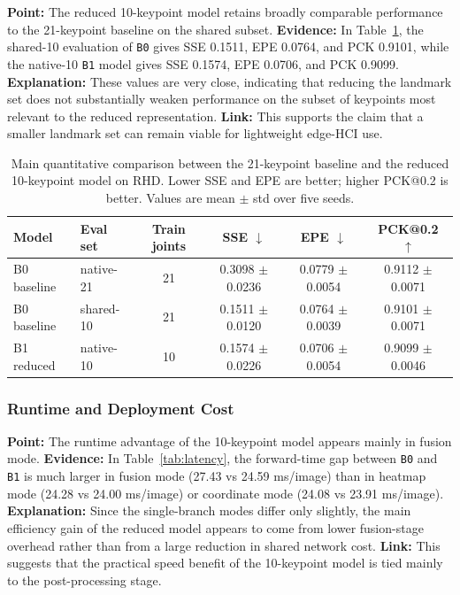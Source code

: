 \documentclass[10pt,letterpaper]{article}
\begin{document}
\noindent\textbf{Point:} The reduced 10-keypoint model retains broadly comparable performance to the 21-keypoint baseline on the shared subset.  
\textbf{Evidence:} In Table~\ref{tab:main_accuracy}, the shared-10 evaluation of \texttt{B0} gives SSE 0.1511, EPE 0.0764, and PCK 0.9101, while the native-10 \texttt{B1} model gives SSE 0.1574, EPE 0.0706, and PCK 0.9099.  
\textbf{Explanation:} These values are very close, indicating that reducing the landmark set does not substantially weaken performance on the subset of keypoints most relevant to the reduced representation.  
\textbf{Link:} This supports the claim that a smaller landmark set can remain viable for lightweight edge-HCI use.

\begin{table}[H]
\centering
\footnotesize
\caption{Main quantitative comparison between the 21-keypoint baseline and the reduced 10-keypoint model on RHD. Lower SSE and EPE are better; higher PCK@0.2 is better. Values are mean $\pm$ std over five seeds.}
\label{tab:main_accuracy}
\begin{tabular}{llcccc}
\toprule
Model & Eval set & Train joints & SSE $\downarrow$ & EPE $\downarrow$ & PCK@0.2 $\uparrow$ \\
\midrule
B0 baseline & native-21 & 21 & 0.3098 $\pm$ 0.0236 & 0.0779 $\pm$ 0.0054 & 0.9112 $\pm$ 0.0071 \\
B0 baseline & shared-10 & 21 & 0.1511 $\pm$ 0.0120 & 0.0764 $\pm$ 0.0039 & 0.9101 $\pm$ 0.0071 \\
B1 reduced & native-10 & 10 & 0.1574 $\pm$ 0.0226 & 0.0706 $\pm$ 0.0054 & 0.9099 $\pm$ 0.0046 \\
\bottomrule
\end{tabular}
\end{table}

\subsubsection{Runtime and Deployment Cost}

\medskip
\noindent\textbf{Point:} The runtime advantage of the 10-keypoint model appears mainly in fusion mode.  
\textbf{Evidence:} In Table~\ref{tab:latency}, the forward-time gap between \texttt{B0} and \texttt{B1} is much larger in fusion mode (27.43 vs 24.59 ms/image) than in heatmap mode (24.28 vs 24.00 ms/image) or coordinate mode (24.08 vs 23.91 ms/image).  
\textbf{Explanation:} Since the single-branch modes differ only slightly, the main efficiency gain of the reduced model appears to come from lower fusion-stage overhead rather than from a large reduction in shared network cost.  
\textbf{Link:} This suggests that the practical speed benefit of the 10-keypoint model is tied mainly to the post-processing stage.
\end{document}
